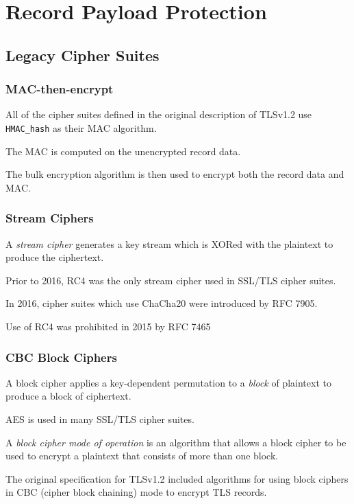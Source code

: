\documentclass[aspectratio=169]{beamer}
\begin{document}
\section{Record Payload Protection}
\begin{frame}[Roundel=siiorange]
	\tocpage
\end{frame}

\subsection{Legacy Cipher Suites}
\begin{frame}
	\frametitle{MAC-then-encrypt}
	All of the cipher suites defined in the original description of TLSv1.2 use \texttt{HMAC\_hash} as their MAC algorithm.

	\vfill
	
	The MAC is computed on the unencrypted record data.
	
	\vfill
	
	The bulk encryption algorithm is then used to encrypt both the record data and MAC.
\end{frame}

\begin{frame}
	\frametitle{Stream Ciphers}
	A \emph{stream cipher} generates a key stream which is XORed with the plaintext to produce the ciphertext.
	
	\vfill
	
	Prior to 2016, RC4 was the only stream cipher used in SSL/TLS cipher suites.
	
	\vfill
	
	In 2016, cipher suites which use ChaCha20 were introduced by RFC 7905.
	
	\vfill
	
	Use of RC4 was prohibited in 2015 by RFC 7465
\end{frame}

\begin{frame}
	\frametitle{CBC Block Ciphers}
	A block cipher applies a key-dependent permutation to a \emph{block} of plaintext to produce a block of ciphertext.
	
	\vfill
	
	AES is used in many SSL/TLS cipher suites.
	
	\vfill
	
	A \emph{block cipher mode of operation} is an algorithm that allows a block cipher to be used to encrypt a plaintext that consists of more than one block. 
	
	\vfill 
	
	The original specification for TLSv1.2 included algorithms for using block ciphers in CBC (cipher block chaining) mode to encrypt TLS records.
\end{frame}
\end{document}
